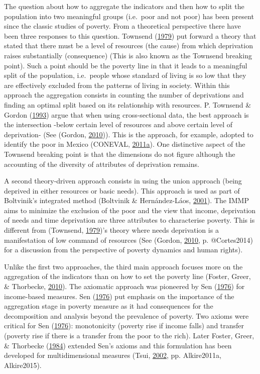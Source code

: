 \documentclass[]{book}
\begin{document}
The question about how to aggregate the indicators and then how to split the population into two meaningful groups (i.e.~poor and not poor) has been present since the classic studies of poverty. From a theoretical perspective there have been three responses to this question. Townsend (\protect\hyperlink{ref-Townsend1979}{1979}) put forward a theory that stated that there must be a level of resources (the cause) from which deprivation raises substantially (consequence) (This is also known as the Townsend breaking point). Such a point should be the poverty line in that it leads to a meaningful split of the population, i.e.~people whose standard of living is so low that they are effectively excluded from the patterns of living in society. Within this approach the aggregation consists in counting the number of deprivations and finding an optimal split based on its relationship with resources. P. Townsend \& Gordon (\protect\hyperlink{ref-Townsend1993d}{1993}) argue that when using cross-sectional data, the best approach is the intersection -below certain level of resources and above certain level of deprivation- (See (Gordon, \protect\hyperlink{ref-Gordon2010}{2010})). This is the approach, for example, adopted to identify the poor in Mexico (CONEVAL, \protect\hyperlink{ref-CONEVAL2011a}{2011}\protect\hyperlink{ref-CONEVAL2011a}{a}). One distinctive aspect of the Townsend breaking point is that the dimensions do not figure although the accounting of the diversity of attributes of deprivation remains.

A second theory-driven approach consists in using the union approach (being deprived in either resources or basic needs). This approach is used as part of Boltvinik's integrated method (Boltvinik \& Hernández-Láos, \protect\hyperlink{ref-Boltvinik2001}{2001}). The IMMP aims to minimize the exclusion of the poor and the view that income, deprivation of needs and time deprivation are three attributes to characterise poverty. This is different from (Townsend, \protect\hyperlink{ref-Townsend1979}{1979})'s theory where needs deprivation is a manifestation of low command of resources (See (Gordon, \protect\hyperlink{ref-Gordon2010}{2010}, p. @Cortes2014) for a discussion from the perspective of poverty dynamics and human rights).

Unlike the first two approaches, the third main approach focuses more on the aggregation of the indicators than on how to set the poverty line (Foster, Greer, \& Thorbecke, \protect\hyperlink{ref-Foster2010a}{2010}). The axiomatic approach was pioneered by Sen (\protect\hyperlink{ref-Sen1976}{1976}) for income-based measures. Sen (\protect\hyperlink{ref-Sen1976}{1976}) put emphasis on the importance of the aggregation stage in poverty measure as it had consequences for the decomposition and analysis beyond the prevalence of poverty. Two axioms were critical for Sen (\protect\hyperlink{ref-Sen1976}{1976}): monotonicity (poverty rise if income falls) and transfer (poverty rise if there is a transfer from the poor to the rich). Later Foster, Greer, \& Thorbecke (\protect\hyperlink{ref-Foster1984}{1984}) extended Sen's axioms and this formulation has been developed for multidimensional measures (Tsui, \protect\hyperlink{ref-Tsui2002}{2002}, pp. Alkire2011a, Alkire2015).
\end{document}
